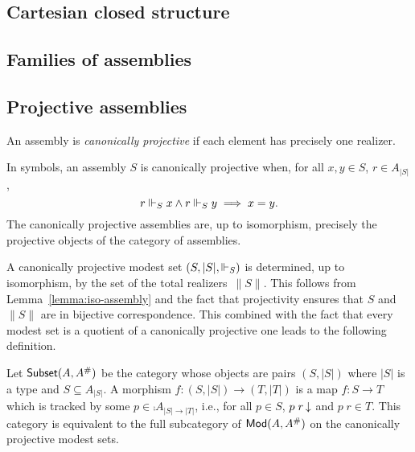 
\subsection{Cartesian closed structure}
\label{sec:ccc}

\subsection{Families of assemblies}
\label{sec:dependent-types}




\subsection{Projective assemblies}
\label{sec:projective-assemblies}


\begin{definition}
  An assembly is \emph{canonically projective} if each element has
  precisely one realizer.
\end{definition}

\noindent
In symbols, an assembly $S$ is canonically projective when, for all
$x, y \in S$, $r \in A_{|S|}$,
%
\begin{equation*}
  r \Vdash_S x \land r \Vdash_S y \implies x = y.
\end{equation*}
%
The canonically projective assemblies are, up to isomorphism,
precisely the projective objects of the category of assemblies.

A canonically projective modest set $(S, |S|, {\Vdash_S})$ is determined,
up to isomorphism, by the set of the total realizers~$\|S\|$. This
follows from Lemma~\ref{lemma:iso-assembly} and the fact that
projectivity ensures that $S$ and $\|S\|$ are in bijective
correspondence. This combined with the fact that every modest set is a
quotient of a canonically projective one leads to the following
definition.

Let $\mathsf{Subset}(A, A^{\#})$ be the category whose objects are pairs
$(S, |S|)$ where $|S|$ is a type and $S \subseteq A_{|S|}$. A morphism
$f : (S, |S|) \to (T, |T|)$ is a map $f : S \to T$ which is tracked by
some $p \in \comp{A}_{|S| \to |T|}$, i.e., for all $p \in S$,
$p\;r\,{\downarrow}$ and $p\;r \in T$. This category is equivalent to the
full subcategory of $\mathsf{Mod}(A, A^{\#})$ on the canonically projective
modest sets.


